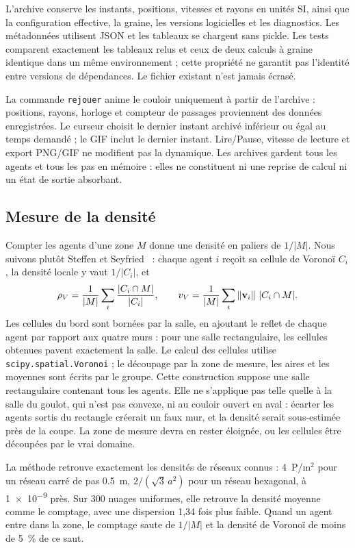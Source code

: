 L'archive conserve les instants, positions, vitesses et rayons en unités SI, ainsi que
la configuration effective, la graine, les versions logicielles et les diagnostics.
Les métadonnées utilisent JSON et les tableaux se chargent sans pickle. Les tests
comparent exactement les tableaux relus et ceux de deux calculs à graine identique
dans un même environnement ; cette propriété ne garantit pas l'identité entre versions
de dépendances. Le fichier existant n'est jamais écrasé.

La commande \texttt{rejouer} anime le couloir uniquement à partir de l'archive : positions,
rayons, horloge et compteur de passages proviennent des données enregistrées. Le curseur
choisit le dernier instant archivé inférieur ou égal au temps demandé ; le GIF inclut
le dernier instant. Lire/Pause, vitesse de lecture et export PNG/GIF ne modifient pas
la dynamique. Les archives gardent tous les agents et tous les pas en mémoire : elles
ne constituent ni une reprise de calcul ni un état de sortie absorbant.

\subsection{Mesure de la densité}
\label{sec:mesure-densite}

Compter les agents d'une zone $M$ donne une densité en paliers de $1/|M|$. Nous
suivons plutôt Steffen et Seyfried~\cite{steffen2010} : chaque agent $i$ reçoit sa
cellule de Voronoï $C_i$, la densité locale y vaut $1/|C_i|$, et
\[
\rho_V=\frac{1}{|M|}\sum_i\frac{|C_i\cap M|}{|C_i|},\qquad
v_V=\frac{1}{|M|}\sum_i\left\lVert \mathbf{v}_i \right\rVert\,|C_i\cap M|.
\]
Les cellules du bord sont bornées par la salle, en ajoutant le reflet de chaque agent
par rapport aux quatre murs : pour une salle rectangulaire, les cellules obtenues pavent
exactement la salle. Le calcul des cellules utilise \texttt{scipy.spatial.Voronoi} ;
le découpage par la zone de mesure, les aires et les moyennes sont écrits par le groupe.
Cette construction suppose une salle rectangulaire contenant tous les agents. Elle ne
s'applique pas telle quelle à la salle du goulot, qui n'est pas convexe, ni au couloir
ouvert en aval : écarter les agents sortis du rectangle créerait un faux mur, et la
densité serait sous-estimée près de la coupe. La zone de mesure devra en rester éloignée,
ou les cellules être découpées par le vrai domaine.

La méthode retrouve exactement les densités de réseaux connus : \num{4}~P/m$^2$
pour un réseau carré de pas \SI{0.5}{\metre}, $2/(\sqrt3\,a^2)$ pour un réseau hexagonal,
à \num{1e-9} près. Sur 300 nuages uniformes, elle retrouve la densité moyenne comme le
comptage, avec une dispersion 1,34 fois plus faible. Quand un agent entre dans la zone,
le comptage saute de $1/|M|$ et la densité de Voronoï de moins de \SI{5}{\percent} de ce saut.


